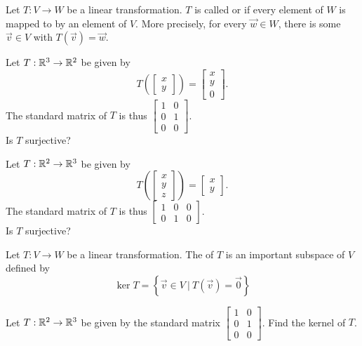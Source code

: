 \begin{applicationActivities}{2}{18}
\begin{definition}
Let $T: V \rightarrow W$ be a linear transformation.
$T$ is called  or  if every element of $W$ is mapped to by an element of $V$.  More precisely, for every $\vec{w} \in W$, there is some $\vec{v} \in V$ with $T(\vec{v})=\vec{w}$.
\end{definition}

\begin{activity}{5}
Let $T: \mathbb{R}^3 \rightarrow \mathbb{R}^2$ be given by $$T\left(\begin{bmatrix}x \\ y \end{bmatrix} \right) = \begin{bmatrix} x \\ y \\ 0 \end{bmatrix}.$$
The standard matrix of $T$ is thus $\begin{bmatrix} 1 & 0 \\ 0 & 1 \\ 0 & 0 \end{bmatrix}$. \\
Is $T$ surjective?
\end{activity}

\begin{activity}{5}
Let $T: \mathbb{R}^2 \rightarrow \mathbb{R}^3$ be given by $$T\left(\begin{bmatrix} x \\ y \\ z \end{bmatrix} \right) = \begin{bmatrix} x \\ y \end{bmatrix}.$$  The standard matrix of $T$ is thus $\begin{bmatrix} 1 & 0 &0  \\ 0 & 1 & 0 \end{bmatrix}$.\\
Is $T$ surjective?
\end{activity}


\begin{definition}
Let $T: V \rightarrow W$ be a linear transformation.  The  of $T$
is an important subspace of \(V\) defined by
\[
\ker T = \left\{ \vec{v} \in V\ \big|\ T(\vec{v})=\vec{0}\right\}
\]
\end{definition}

\begin{activity}{5}
Let $T: \mathbb{R}^2 \rightarrow \mathbb{R}^3$ be given by the standard matrix $\begin{bmatrix} 1 & 0 \\ 0 & 1 \\ 0 & 0 \end{bmatrix}$.  Find the kernel of $T$.
\end{activity}


\end{applicationActivities}
